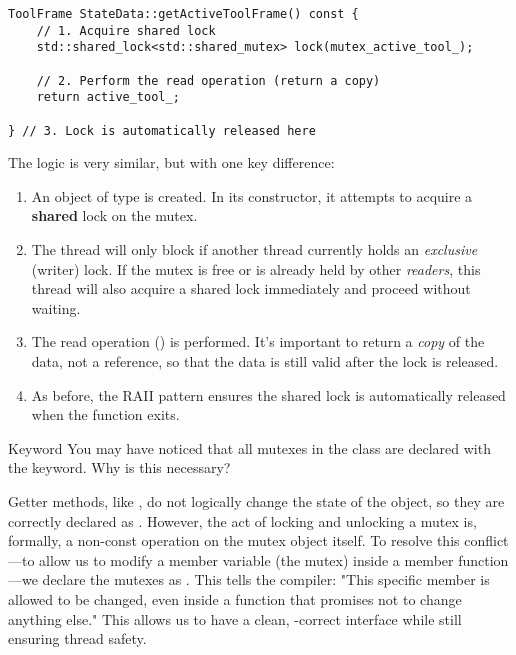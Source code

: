 \begin{verbatim}
ToolFrame StateData::getActiveToolFrame() const {
    // 1. Acquire shared lock
    std::shared_lock<std::shared_mutex> lock(mutex_active_tool_);
    
    // 2. Perform the read operation (return a copy)
    return active_tool_;
    
} // 3. Lock is automatically released here
\end{verbatim}
\label{lst:statedata-getter}

The logic is very similar, but with one key difference:
\begin{enumerate}
    \item An object of type  is created. In its constructor, it attempts to acquire a \textbf{shared} lock on the mutex.
    \item The thread will only block if another thread currently holds an \textit{exclusive} (writer) lock. If the mutex is free or is already held by other \textit{readers}, this thread will also acquire a shared lock immediately and proceed without waiting.
    \item The read operation () is performed. It's important to return a \textit{copy} of the data, not a reference, so that the data is still valid after the lock is released.
    \item As before, the RAII pattern ensures the shared lock is automatically released when the function exits.
\end{enumerate}

\begin{tipbox}{ Keyword}
You may have noticed that all mutexes in the class are declared with the  keyword. Why is this necessary?

Getter methods, like , do not logically change the state of the object, so they are correctly declared as . However, the act of locking and unlocking a mutex is, formally, a non-const operation on the mutex object itself. To resolve this conflict—to allow us to modify a member variable (the mutex) inside a  member function—we declare the mutexes as . This tells the compiler: "This specific member is allowed to be changed, even inside a function that promises not to change anything else." This allows us to have a clean, -correct interface while still ensuring thread safety.
\end{tipbox}

